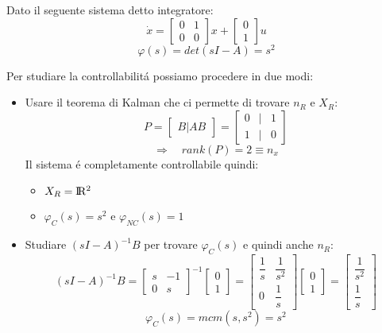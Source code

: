 \documentclass[../main.tex]{subfiles}
\begin{document}
		\begin{mdframed}[style=Exercise]
			\begin{Exercise}[title={Calcolare $ X_R $ e $ \varphi_C(s) $}, difficulty=1]
				Dato il seguente sistema detto integratore:
				\[ 
					\dot x =
					\begin{bmatrix}
						0 & 1\\
						0 & 0
					\end{bmatrix} x +
					\begin{bmatrix}
						0\\
						1
					\end{bmatrix} u
				\]
				\[
					\varphi(s) = det\left( sI-A \right) = s^2
				\]
				
				Per studiare la controllabilit\'a possiamo procedere in due modi:
				\begin{itemize}
					\item
						Usare il teorema di Kalman che ci permette di trovare $ n_R $ e $ X_R $:
						\[
							P =
							\begin{bmatrix}
								B | AB
							\end{bmatrix} =
							\begin{bmatrix}
								0 & | & 1\\
								1 & | & 0
							\end{bmatrix}
						\]
						\[
							\Rightarrow\quad rank\left( P \right) = 2 \equiv n_x
						\]
						Il sistema \'e completamente controllabile quindi: 
						\begin{itemize}
							\item 
								$ X_R = \rm I\!R^2 $
							\item
								$ \varphi_C(s) = s^2 $ e $ \varphi_{NC}(s) = 1 $
						\end{itemize}
					\item
						Studiare $ (sI-A)^{-1}B $ per trovare $ \varphi_C(s) $ e quindi anche $ n_R $:
						\[
							(sI-A)^{-1}B =
							\begin{bmatrix}
								s & -1\\
								0 & s
							\end{bmatrix}^{-1}
							\begin{bmatrix}
								0\\
								1
							\end{bmatrix}=
							\begin{bmatrix}
								\dfrac{1}{s} & \dfrac{1}{s^2}
								\\[1em]
								0 & \dfrac{1}{s}
							\end{bmatrix}
							\begin{bmatrix}
								0\\
								1
							\end{bmatrix} =
							\begin{bmatrix}
								\dfrac{1}{s^2}
								\\[1em]
								\dfrac{1}{s}
							\end{bmatrix}	
						\]
						\[
							\varphi_C(s) = mcm\left( s, s^2 \right) = s^2
						\]
						

\end{itemize}
\end{Exercise}
\end{mdframed}
\end{document}

